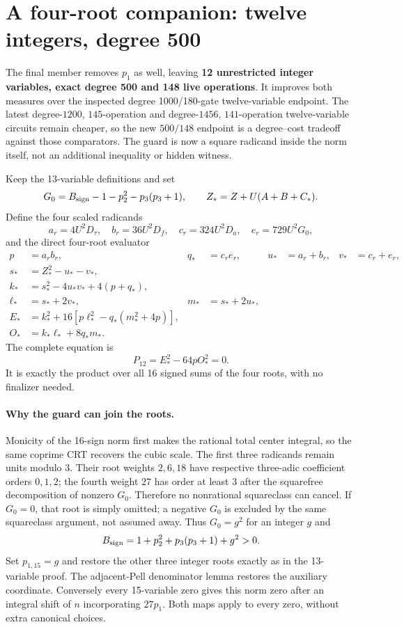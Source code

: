 \section{A four-root companion: twelve integers, degree 500}
\label{sec:four-carrier}
The final member removes $p_1$ as well, leaving \textbf{12 unrestricted
integer variables, exact degree 500 and 148 live operations}.  It improves
both measures over the inspected degree 1000/180-gate twelve-variable
endpoint. The latest degree-$1200$, $145$-operation and degree-$1456$,
$141$-operation twelve-variable circuits remain cheaper, so the new
$500/148$ endpoint is a degree--cost tradeoff against those comparators.
The guard is now a square radicand inside the norm itself, not an
additional inequality or hidden witness.

Keep the 13-variable definitions and set
\[
 G_0=B_{\rm sign}-1-p_2^2-p_3(p_3+1),\qquad
 Z_*=Z+U(A+B+C_*).
\]
Define the four scaled radicands
\[
 a_r=4U^2D_\tau,\quad b_r=36U^2D_f,\quad
 c_r=324U^2D_a,\quad e_r=729U^2G_0,
\]
and the direct four-root evaluator
\begin{align*}
 p&=a_rb_r,&q_*&=c_re_r,&u_*&=a_r+b_r,&v_*&=c_r+e_r,\\
 s_*&=Z_*^2-u_*-v_*,\\
 k_*&=s_*^2-4u_*v_*+4(p+q_*),\\
 \ell_*&=s_*+2v_*,&m_*&=s_*+2u_*,\\
 E_*&=k_*^2+16[p\ell_*^2-q_*(m_*^2+4p)],\\
 O_*&=k_*\ell_*+8q_*m_*.
\end{align*}
The complete equation is
\[
 \boxed{P_{12}=E_*^2-64pO_*^2=0.}
\]
It is exactly the product over all 16 signed sums of the four roots, with
no finalizer needed.

\paragraph{Why the guard can join the roots.}
Monicity of the 16-sign norm first makes the rational total center integral,
so the same coprime CRT recovers the cubic scale.  The first three radicands
remain units modulo 3.  Their root weights $2,6,18$ have respective
three-adic coefficient orders $0,1,2$; the fourth weight $27$ has order
at least 3 after the squarefree decomposition of nonzero $G_0$.
Therefore no nonrational squareclass can cancel.  If $G_0=0$, that root is
simply omitted; a negative $G_0$ is excluded by the same squareclass argument,
not assumed away.  Thus $G_0=g^2$ for an integer $g$ and
\[
 B_{\rm sign}=1+p_2^2+p_3(p_3+1)+g^2>0.
\]
Set $p_{1,15}=g$ and restore the other three integer roots exactly as in
the 13-variable proof.  The adjacent-Pell denominator lemma restores the
auxiliary coordinate.  Conversely every 15-variable zero gives this norm
zero after an integral shift of $n$ incorporating $27p_1$.  Both maps apply
to every zero, without extra canonical choices.

